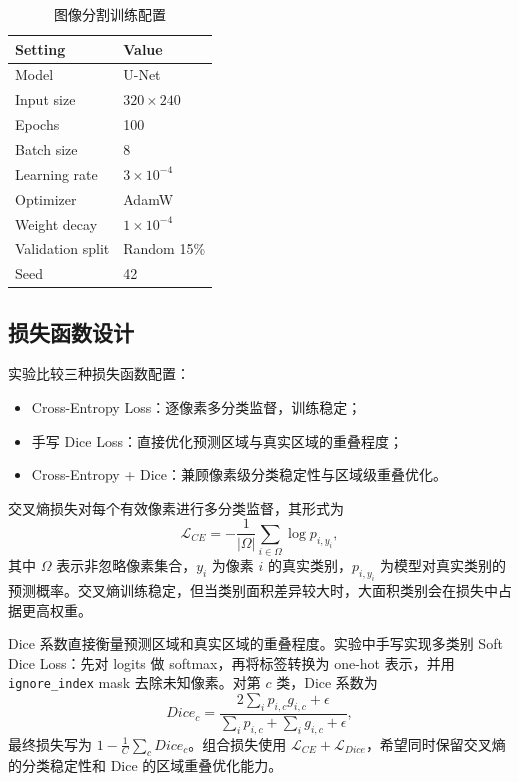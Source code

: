 \documentclass[UTF8,a4paper,11pt]{ctexart}
\newcommand{\code}[1]{\texttt{#1}}
\begin{document}
\begin{table}[H]
    \centering
    \caption{图像分割训练配置}
    \small
    \begin{tabular}{ll}
        \toprule
        Setting & Value \\
        \midrule
        Model & U-Net \\
        Input size & \(320 \times 240\) \\
        Epochs & 100 \\
        Batch size & 8 \\
        Learning rate & \(3\times10^{-4}\) \\
        Optimizer & AdamW \\
        Weight decay & \(1\times10^{-4}\) \\
        Validation split & Random 15\% \\
        Seed & 42 \\
        \bottomrule
    \end{tabular}
\end{table}

\subsection{损失函数设计}

实验比较三种损失函数配置：
\begin{itemize}
    \item Cross-Entropy Loss：逐像素多分类监督，训练稳定；
    \item 手写 Dice Loss：直接优化预测区域与真实区域的重叠程度；
    \item Cross-Entropy + Dice：兼顾像素级分类稳定性与区域级重叠优化。
\end{itemize}

交叉熵损失对每个有效像素进行多分类监督，其形式为
\begin{equation}
    \mathcal{L}_{CE} = - \frac{1}{|\Omega|}\sum_{i \in \Omega}\log p_{i,y_i},
\end{equation}
其中 \(\Omega\) 表示非忽略像素集合，\(y_i\) 为像素 \(i\) 的真实类别，\(p_{i,y_i}\) 为模型对真实类别的预测概率。交叉熵训练稳定，但当类别面积差异较大时，大面积类别会在损失中占据更高权重。

Dice 系数直接衡量预测区域和真实区域的重叠程度。实验中手写实现多类别 Soft Dice Loss：先对 logits 做 softmax，再将标签转换为 one-hot 表示，并用 \code{ignore\_index} mask 去除未知像素。对第 \(c\) 类，Dice 系数为
\begin{equation}
    Dice_c = \frac{2\sum_i p_{i,c}g_{i,c} + \epsilon}{\sum_i p_{i,c} + \sum_i g_{i,c} + \epsilon},
\end{equation}
最终损失写为 \(1-\frac{1}{C}\sum_c Dice_c\)。组合损失使用 \(\mathcal{L}_{CE}+\mathcal{L}_{Dice}\)，希望同时保留交叉熵的分类稳定性和 Dice 的区域重叠优化能力。
\end{document}
